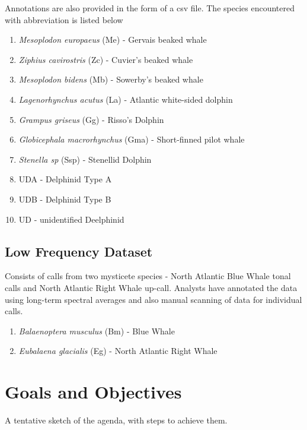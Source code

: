 \documentclass[final]{article}
\begin{document}
Annotations are also provided in the form of a csv file. The species encountered with abbreviation is listed below\\
\begin{enumerate}
\item \textit{Mesoplodon europaeus} (Me) - Gervais beaked whale
\item \textit{Ziphius cavirostris} (Zc) - Cuvier's beaked whale
\item \textit{Mesoplodon bidens} (Mb) - Sowerby's beaked whale
\item \textit{Lagenorhynchus acutus} (La) - Atlantic white-sided dolphin
\item \textit{Grampus griseus} (Gg) - Risso's Dolphin
\item \textit{Globicephala macrorhynchus} (Gma) - Short-finned pilot whale
\item \textit{Stenella sp} (Ssp) - Stenellid Dolphin
\item UDA - Delphinid Type A
\item UDB - Delphinid Type B
\item UD - unidentified Deelphinid

\end{enumerate}


\subsection{Low Frequency Dataset}
Consists of calls from two mysticete species - North Atlantic Blue Whale tonal calls and North Atlantic Right Whale up-call. Analysts have annotated the data using long-term spectral averages and also manual scanning of data for individual calls.

\begin{enumerate}
\item \textit{Balaenoptera musculus} (Bm) - Blue Whale
\item \textit{Eubalaena glacialis} (Eg) - North Atlantic Right Whale
\end{enumerate}

\section{Goals and Objectives}
A tentative sketch of the agenda, with steps to achieve them. 
\end{document}
